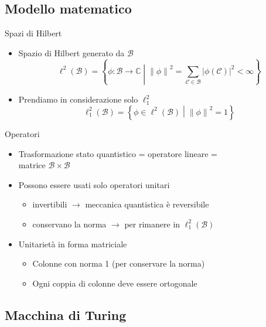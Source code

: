 \documentclass{beamer}
\newcommand{\spacedmiddle}[1]{\mathrel{}\middle#1\mathrel{}}
\newcommand{\hil}{\ell^{2}}
\newcommand{\hiluninorm}{\hil_{1}}
\begin{document}
\subsection{Modello matematico}

\begin{frame}{\subsecname}{Spazi di Hilbert}
	\begin{itemize}
		\item<+-> \alert{Spazio di Hilbert} generato da \( \mathcal{B} \)
		\[ \hil \left ( \mathcal{B} \right ) = \left \{ \phi : \mathcal{B} \rightarrow \mathbb{C} \spacedmiddle | \left \| \phi \right \|^{2} = \sum_{\mathcal{C} \in \mathcal{B}} \left | \phi \left ( \mathcal{C} \right ) \right |^{2} < \infty \right \}\]
		\item<+-> Prendiamo in considerazione solo \(\hiluninorm\)
		\[ \hiluninorm \left ( \mathcal{B} \right ) = \left \{ \phi \in \hil \left ( \mathcal{B} \right ) \spacedmiddle | \left \| \phi \right \|^{2} = 1 \right \}\]
	\end{itemize}
\end{frame}

\begin{frame}{\subsecname}{Operatori}
	\begin{itemize}
		\item<+-> Trasformazione stato quantistico = operatore lineare = \\
		matrice \( \mathcal{B} \times \mathcal{B} \)
		\item<+-> Possono essere usati solo \alert{operatori unitari}
		\begin{itemize}
			\item invertibili \(\rightarrow\) meccanica quantistica è reversibile
			\item conservano la norma \(\rightarrow\) per rimanere in \(\hiluninorm \left ( \mathcal{B} \right )\)
		\end{itemize}
		\item<+-> Unitarietà in forma matriciale
		\begin{itemize}
			\item Colonne con norma 1 (per conservare la norma)
			\item Ogni coppia di colonne deve essere ortogonale
		\end{itemize}
	\end{itemize}
\end{frame}

\subsection{Macchina di Turing}
\end{document}
